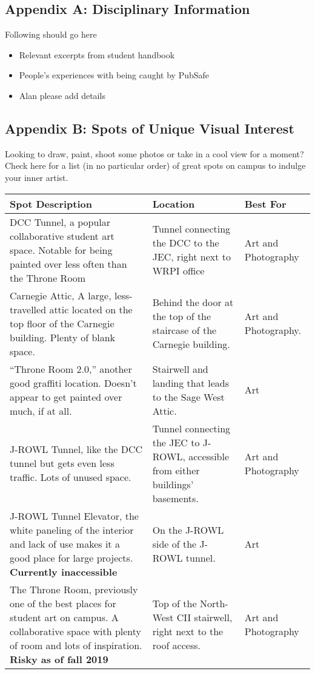 \documentclass{article}
\begin{document}
\subsection{Appendix A: Disciplinary Information}
Following should go here
\begin{itemize}
  \item Relevant excerpts from student handbook
  \item People’s experiences with being caught by PubSafe
  \item Alan please add details
\end{itemize}
\subsection{Appendix B: Spots of Unique Visual Interest}
Looking to draw, paint, shoot some photos or take in a cool view for a moment? Check here for a list (in no particular order) of great spots on campus to indulge your inner artist.
\renewcommand{\arraystretch}{2}
\begin{center}
  \begin{tabular}{||p{7cm}|p{4cm}|p{4cm}||} 
    \hline
    Spot Description & Location & Best For \\
    \hline
    DCC Tunnel, a popular collaborative student art space. Notable for being painted over less often than the Throne Room
    & Tunnel connecting the DCC to the JEC, right next to WRPI office
    & Art and Photography\\
    \hline

    Carnegie Attic, A large, less-travelled attic located on the top floor of the Carnegie building. Plenty of blank space.
    &Behind the door at the top of the staircase of the Carnegie building.
    &Art and Photography.\\
    \hline

    “Throne Room 2.0,” another good graffiti location. Doesn’t appear to get painted over much, if at all.
    &Stairwell and landing that leads to the Sage West Attic.
    &Art\\
    \hline

    J-ROWL Tunnel, like the DCC tunnel but gets even less traffic. Lots of unused space.
    &Tunnel connecting the JEC to J-ROWL, accessible from either buildings’ basements.
    &Art and Photography\\
    \hline

    J-ROWL Tunnel Elevator, the white paneling of the interior and lack of use makes it a good place for large projects. 
    \textbf{Currently inaccessible}
    &On the J-ROWL side of the J-ROWL tunnel.
    &Art\\
    \hline

    The Throne Room, previously one of the best places for student art on campus. A collaborative space with plenty of room and lots of inspiration. \textbf{Risky as of fall 2019}
    &Top of the North-West CII stairwell, right next to the roof access.
    &Art and Photography\\
    \hline
  \end {tabular}
\end{center}
\end{document}
